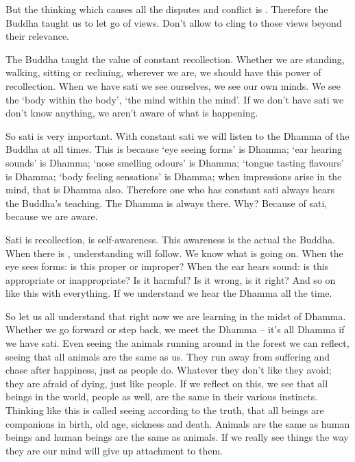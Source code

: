 But the thinking which causes all the disputes and conflict is . Therefore the Buddha taught us to let go of views. Don't allow  to cling to those views beyond their relevance. 

The Buddha taught the value of constant  recollection. Whether we are standing, walking, sitting or reclining, wherever we are, we should have this power of recollection. When we have sati we see ourselves, we see our own minds. We see the `body within the body', `the mind within the mind'. If we don't have sati we don't know anything, we aren't aware of what is happening. 

So sati is very important. With constant sati we will listen to the Dhamma of the Buddha at all times. This is because `eye seeing forms' is Dhamma; `ear hearing sounds' is Dhamma; `nose smelling odours' is Dhamma; `tongue tasting flavours' is Dhamma; `body feeling sensations' is Dhamma; when impressions arise in the mind, that is Dhamma also. Therefore one who has constant sati always hears the Buddha's teaching. The Dhamma is always there. Why? Because of sati, because we are aware. 

Sati is recollection,  is self-awareness. This awareness is the actual  the Buddha. When there is , understanding will follow. We know what is going on. When the eye sees forms: is this proper or improper? When the ear hears sound: is this appropriate or inappropriate? Is it harmful? Is it wrong, is it right? And so on like this with everything. If we understand we hear the Dhamma all the time. 

So let us all understand that right now we are learning in the midst of Dhamma. Whether we go forward or step back, we meet the Dhamma -- it's all Dhamma if we have sati. Even seeing the animals running around in the forest we can reflect, seeing that all animals are the same as us. They run away from suffering and chase after happiness, just as people do. Whatever they don't like they avoid; they are afraid of dying, just like people. If we reflect on this, we see that all beings in the world, people as well, are the same in their various instincts. Thinking like this is called  seeing according to the truth, that all beings are companions in birth, old age, sickness and death. Animals are the same as human beings and human beings are the same as animals. If we really see things the way they are our mind will give up attachment to them. 

